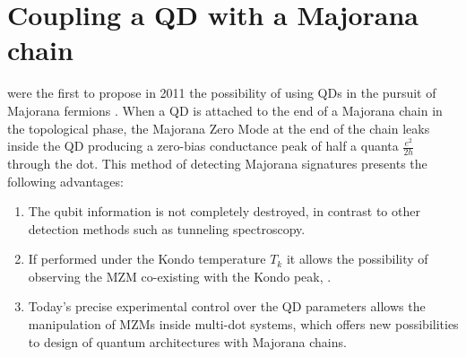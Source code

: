 \chapter{Coupling a QD with a Majorana chain \label{chap:Majorana} \label{sec:QD-Majorana}}














\citeauthor{liu_detecting_2011} were the first to propose in 2011 the possibility of using QDs in the pursuit of Majorana fermions . When a QD is attached to the end of a Majorana chain in the topological phase,  the Majorana Zero Mode at the end of the chain leaks inside the QD \cite{vernek_subtle_2014} producing a zero-bias conductance peak of half a quanta $\frac{e^{2}}{2h}$ through the dot.  This method of detecting Majorana signatures presents the following  advantages:

\begin{enumerate}
  \item The qubit information  is not completely destroyed, in contrast to other detection methods such as tunneling spectroscopy.
  \item If performed under the  Kondo temperature $T_k$ it allows the possibility of observing the  MZM co-existing with the Kondo peak, \cite{lee_kondo_2013,ruiz-tijerina_interaction_2015,gorski_interplay_2018} .
  \item Today's precise experimental control over the QD parameters allows the manipulation of MZMs inside multi-dot systems, which offers new possibilities to design of quantum architectures with Majorana chains.\cite{barkeshli_physical_2015,karzig_scalable_2017} 
\end{enumerate}

